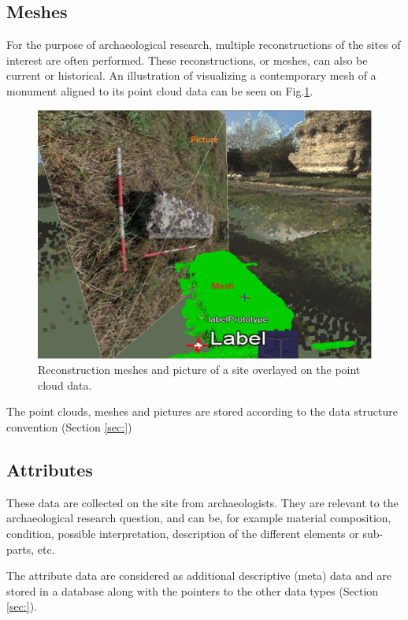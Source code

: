 \subsection{Meshes}
For the purpose of archaeological research, multiple reconstructions of the sites of interest are often performed. These reconstructions, or meshes, can also be current or historical. An illustration of visualizing a contemporary mesh of a monument aligned to its point cloud data can be seen on Fig.\ref{fig:viaAppiaMeshPicture}.

\begin{figure}[!ht]
\centering
\includegraphics[scale=0.5]{fig/conceptual_description/ViaAppiaMeshPicture.pdf}
\caption{Reconstruction meshes and picture of a site overlayed on the point cloud data.}
\label{fig:viaAppiaMeshPicture}
\end{figure}


The point clouds, meshes and pictures are stored according to the data structure convention (Section \ref{sec:})

\subsection {Attributes}
These data are collected on the site from archaeologists. They are relevant to the archaeological research question,  and can be, for example material composition, condition, possible interpretation, description of the different elements or sub-parts, etc.  

The attribute data are considered as additional descriptive (meta) data and are stored in a database along with the pointers to the other data types (Section \ref{sec:}).